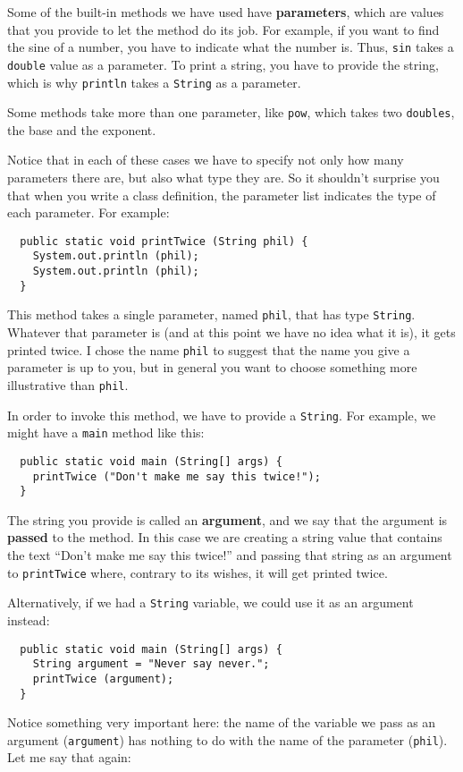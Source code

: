 \documentclass{book}
\begin{document}
Some of the built-in methods we have used have {\bf parameters},
which are values that you provide to let the method do its
job.  For example, if you want to find the sine of a number,
you have to indicate what the number is.  Thus, {\tt sin}
takes a {\tt double} value as a parameter.  To print a string,
you have to provide the string, which is why {\tt println}
takes a {\tt String} as a parameter.

Some methods take more than one parameter, like {\tt pow},
which takes two {\tt doubles}, the base and the exponent.

Notice that in each of these cases we have to specify not
only how many parameters there are, but also what type they
are.  So it shouldn't surprise you that when you write a
class definition, the parameter list indicates the type of
each parameter.  For example:

\begin{verbatim}
  public static void printTwice (String phil) {
    System.out.println (phil);
    System.out.println (phil);
  }
\end{verbatim}
%
This method takes a single parameter, named {\tt phil}, that
has type {\tt String}.  Whatever that parameter is (and at
this point we have no idea what it is), it gets printed
twice.  I chose the name {\tt phil} to suggest that the name
you give a parameter is up to you, but in general you want to
choose something more illustrative than {\tt phil}.

In order to invoke this method, we have to provide a {\tt String}.
For example, we might have a {\tt main} method like this:

\begin{verbatim}
  public static void main (String[] args) {
    printTwice ("Don't make me say this twice!");
  }
\end{verbatim}

The string you provide is called an {\bf argument}, and we
say that the argument is {\bf passed} to the method.  In
this case we are creating a string value that contains the
text ``Don't make me say this twice!'' and passing that
string as an argument to {\tt printTwice} where, contrary
to its wishes, it will get printed twice.

Alternatively, if we had a {\tt String} variable, we could
use it as an argument instead:

\begin{verbatim}
  public static void main (String[] args) {
    String argument = "Never say never.";
    printTwice (argument);
  }
\end{verbatim}
%
Notice something very important here: the name of the variable we pass
as an argument ({\tt argument}) has nothing to do with the name of the
parameter ({\tt phil}).  Let me say that again:
\end{document}
